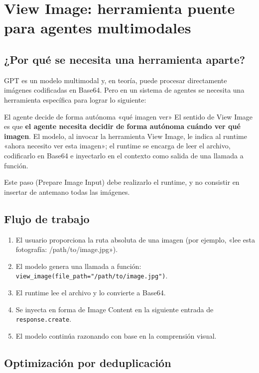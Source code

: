 \section{View Image: herramienta puente para agentes multimodales}

\subsection{¿Por qué se necesita una herramienta aparte?}

GPT es un modelo multimodal y, en teoría, puede procesar directamente imágenes codificadas en Base64. Pero en un sistema de agentes se necesita una herramienta específica para lograr lo siguiente:

\begin{knowledgebox}{El agente decide de forma autónoma «qué imagen ver»}
El sentido de View Image es que \textbf{el agente necesita decidir de forma autónoma cuándo ver qué imagen}. El modelo, al invocar la herramienta View Image, le indica al runtime «ahora necesito ver esta imagen»; el runtime se encarga de leer el archivo, codificarlo en Base64 e inyectarlo en el contexto como salida de una llamada a función.

Este paso (Prepare Image Input) debe realizarlo el runtime, y no consistir en insertar de antemano todas las imágenes.
\end{knowledgebox}

\subsection{Flujo de trabajo}

\begin{enumerate}
    \item El usuario proporciona la ruta absoluta de una imagen (por ejemplo, «lee esta fotografía: /path/to/image.jpg»).
    \item El modelo genera una llamada a función: \texttt{view\_image(file\_path="/path/to/image.jpg")}.
    \item El runtime lee el archivo y lo convierte a Base64.
    \item Se inyecta en forma de Image Content en la siguiente entrada de \texttt{response.create}.
    \item El modelo continúa razonando con base en la comprensión visual.
\end{enumerate}

\subsection{Optimización por deduplicación}

